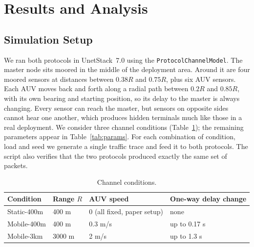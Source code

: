 \documentclass{article}
\begin{document}
\section{Results and Analysis} \label{sec:results}

\subsection{Simulation Setup}
We ran both protocols in UnetStack~7.0 using the \texttt{ProtocolChannelModel}. The master node sits moored in the middle of the deployment area. Around it are four moored sensors at distances between $0.38R$ and $0.75R$, plus six AUV sensors. Each AUV moves back and forth along a radial path between $0.2R$ and $0.85R$, with its own bearing and starting position, so its delay to the master is always changing. Every sensor can reach the master, but sensors on opposite sides cannot hear one another, which produces hidden terminals much like those in a real deployment. We consider three channel conditions (Table~\ref{tab:scenarios}); the remaining parameters appear in Table~\ref{tab:params}. For each combination of condition, load and seed we generate a single traffic trace and feed it to both protocols. The script also verifies that the two protocols produced exactly the same set of packets.

\begin{table}[H]
\centering
\caption{Channel conditions.}
\label{tab:scenarios}
\small
{}
\begin{tabular}{@{}llll@{}}
\toprule
\textbf{Condition} & \textbf{Range $R$} & \textbf{AUV speed} & \textbf{One-way delay change} \\
\midrule
Static-400m & 400 m & 0 (all fixed, paper setup) & none \\
Mobile-400m & 400 m & 0.3 m/s & up to 0.17 s \\
Mobile-3km & 3000 m & 2 m/s & up to 1.3 s \\
\bottomrule
\end{tabular}
\end{table}
\end{document}
